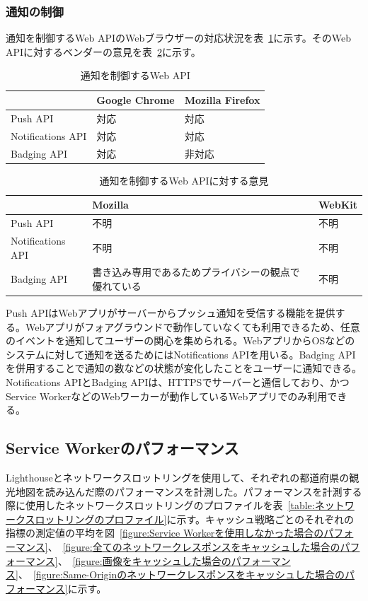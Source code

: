 \subsubsection{通知の制御}
\label{subsubsection:通知の制御}
通知を制御するWeb APIのWebブラウザーの対応状況を表~\ref{table:通知を制御するWeb API}に示す。そのWeb APIに対するベンダーの意見を表~\ref{table:通知を制御するWeb APIに対する意見}に示す。
\begin{table}
  \caption{通知を制御するWeb API}\label{table:通知を制御するWeb API}
  \centering
  \begin{tabular}{|p{13em}|p{8em}|p{8em}|}
    \hline
    & Google Chrome & Mozilla Firefox \\ \hline
    Push API & \cellcolor{green!25}対応 & \cellcolor{green!25}対応 \\ \hline
    Notifications API & \cellcolor{green!25}対応 & \cellcolor{green!25}対応 \\ \hline
    Badging API & \cellcolor{green!25}対応 & \cellcolor{red!25}非対応 \\ \hline
  \end{tabular}
\end{table}
\begin{table}
  \caption{通知を制御するWeb APIに対する意見}
  \label{table:通知を制御するWeb APIに対する意見}
    \centering
    \begin{tabular}{|p{13em}|p{13em}|p{13em}|}
        \hline
        & Mozilla & WebKit \\ \hline
        Push API & 不明 & 不明 \\ \hline
        Notifications API & 不明 & 不明 \\ \hline
        Badging API & \cellcolor{green!25}書き込み専用であるためプライバシーの観点で優れている~\cite{MozillaBadgingAPI} & 不明 \\ \hline
    \end{tabular}
\end{table}
Push APIはWebアプリがサーバーからプッシュ通知を受信する機能を提供する。Webアプリがフォアグラウンドで動作していなくても利用できるため、任意のイベントを通知してユーザーの関心を集められる。WebアプリからOSなどのシステムに対して通知を送るためにはNotifications APIを用いる。Badging APIを併用することで通知の数などの状態が変化したことをユーザーに通知できる。Notifications APIとBadging APIは、HTTPSでサーバーと通信しており、かつService WorkerなどのWebワーカーが動作しているWebアプリでのみ利用できる。
\subsection{Service Workerのパフォーマンス}
\label{subsubsection:Service Workerのパフォーマンス}
Lighthouseとネットワークスロットリングを使用して、それぞれの都道府県の観光地図を読み込んだ際のパフォーマンスを計測した。パフォーマンスを計測する際に使用したネットワークスロットリングのプロファイルを表~\ref{table:ネットワークスロットリングのプロファイル}に示す。キャッシュ戦略ごとのそれぞれの指標の測定値の平均を図~\ref{figure:Service Workerを使用しなかった場合のパフォーマンス}、~\ref{figure:全てのネットワークレスポンスをキャッシュした場合のパフォーマンス}、~\ref{figure:画像をキャッシュした場合のパフォーマンス}、~\ref{figure:Same-Originのネットワークレスポンスをキャッシュした場合のパフォーマンス}に示す。

